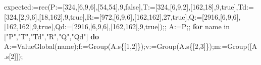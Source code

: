 \documentclass[
  10pt,
  letterpaper,
]{article}
\newenvironment{Shaded}{}{}
\newcommand{\BuiltInTok}[1]{\textcolor[rgb]{0.00,0.50,0.00}{#1}}
\newcommand{\ConstantTok}[1]{\textcolor[rgb]{0.53,0.00,0.00}{#1}}
\newcommand{\ControlFlowTok}[1]{\textcolor[rgb]{0.00,0.44,0.13}{\textbf{#1}}}
\newcommand{\ExtensionTok}[1]{#1}
\newcommand{\FloatTok}[1]{\textcolor[rgb]{0.25,0.63,0.44}{#1}}
\newcommand{\NormalTok}[1]{#1}
\newcommand{\OperatorTok}[1]{\textcolor[rgb]{0.40,0.40,0.40}{#1}}
\newcommand{\StringTok}[1]{\textcolor[rgb]{0.25,0.44,0.63}{#1}}
\newcommand{\VariableTok}[1]{\textcolor[rgb]{0.10,0.09,0.49}{#1}}
\begin{document}
\begin{Shaded}
\begin{Highlighting}[]
\VariableTok{expected}\OperatorTok{:=}\ExtensionTok{rec}\NormalTok{(}\VariableTok{P}\OperatorTok{:=}\NormalTok{[}\FloatTok{324}\OperatorTok{,}\NormalTok{[}\FloatTok{6}\OperatorTok{,}\FloatTok{9}\OperatorTok{,}\FloatTok{6}\NormalTok{]}\OperatorTok{,}\NormalTok{[}\FloatTok{54}\OperatorTok{,}\FloatTok{54}\NormalTok{]}\OperatorTok{,}\FloatTok{9}\OperatorTok{,}\ConstantTok{false}\NormalTok{]}\OperatorTok{,}\VariableTok{T}\OperatorTok{:=}\NormalTok{[}\FloatTok{324}\OperatorTok{,}\NormalTok{[}\FloatTok{6}\OperatorTok{,}\FloatTok{9}\OperatorTok{,}\FloatTok{2}\NormalTok{]}\OperatorTok{,}\NormalTok{[}\FloatTok{162}\OperatorTok{,}\FloatTok{18}\NormalTok{]}\OperatorTok{,}\FloatTok{9}\OperatorTok{,}\ConstantTok{true}\NormalTok{]}\OperatorTok{,}\VariableTok{Td}\OperatorTok{:=}\NormalTok{[}\FloatTok{324}\OperatorTok{,}\NormalTok{[}\FloatTok{2}\OperatorTok{,}\FloatTok{9}\OperatorTok{,}\FloatTok{6}\NormalTok{]}\OperatorTok{,}\NormalTok{[}\FloatTok{18}\OperatorTok{,}\FloatTok{162}\NormalTok{]}\OperatorTok{,}\FloatTok{9}\OperatorTok{,}\ConstantTok{true}\NormalTok{]}\OperatorTok{,}\VariableTok{R}\OperatorTok{:=}\NormalTok{[}\FloatTok{972}\OperatorTok{,}\NormalTok{[}\FloatTok{6}\OperatorTok{,}\FloatTok{9}\OperatorTok{,}\FloatTok{6}\NormalTok{]}\OperatorTok{,}\NormalTok{[}\FloatTok{162}\OperatorTok{,}\FloatTok{162}\NormalTok{]}\OperatorTok{,}\FloatTok{27}\OperatorTok{,}\ConstantTok{true}\NormalTok{]}\OperatorTok{,}\VariableTok{Q}\OperatorTok{:=}\NormalTok{[}\FloatTok{2916}\OperatorTok{,}\NormalTok{[}\FloatTok{6}\OperatorTok{,}\FloatTok{9}\OperatorTok{,}\FloatTok{6}\NormalTok{]}\OperatorTok{,}\NormalTok{[}\FloatTok{162}\OperatorTok{,}\FloatTok{162}\NormalTok{]}\OperatorTok{,}\FloatTok{9}\OperatorTok{,}\ConstantTok{true}\NormalTok{]}\OperatorTok{,}\VariableTok{Qd}\OperatorTok{:=}\NormalTok{[}\FloatTok{2916}\OperatorTok{,}\NormalTok{[}\FloatTok{6}\OperatorTok{,}\FloatTok{9}\OperatorTok{,}\FloatTok{6}\NormalTok{]}\OperatorTok{,}\NormalTok{[}\FloatTok{162}\OperatorTok{,}\FloatTok{162}\NormalTok{]}\OperatorTok{,}\FloatTok{9}\OperatorTok{,}\ConstantTok{true}\NormalTok{])}\OperatorTok{;;}
\VariableTok{A}\OperatorTok{:=}\VariableTok{P}\OperatorTok{;;}
\ControlFlowTok{for} \VariableTok{name} \ExtensionTok{in}\NormalTok{ [}\StringTok{"P"}\OperatorTok{,}\StringTok{"T"}\OperatorTok{,}\StringTok{"Td"}\OperatorTok{,}\StringTok{"R"}\OperatorTok{,}\StringTok{"Q"}\OperatorTok{,}\StringTok{"Qd"}\NormalTok{] }\ControlFlowTok{do}
 \VariableTok{A}\OperatorTok{:=}\BuiltInTok{ValueGlobal}\NormalTok{(}\VariableTok{name}\NormalTok{)}\OperatorTok{;}\VariableTok{f}\OperatorTok{:=}\BuiltInTok{Group}\NormalTok{(}\VariableTok{A}\NormalTok{.}\VariableTok{s}\NormalTok{\{[}\FloatTok{1}\OperatorTok{,}\FloatTok{2}\NormalTok{]\})}\OperatorTok{;}\VariableTok{v}\OperatorTok{:=}\BuiltInTok{Group}\NormalTok{(}\VariableTok{A}\NormalTok{.}\VariableTok{s}\NormalTok{\{[}\FloatTok{2}\OperatorTok{,}\FloatTok{3}\NormalTok{]\})}\OperatorTok{;}\VariableTok{m}\OperatorTok{:=}\BuiltInTok{Group}\NormalTok{([}\VariableTok{A}\NormalTok{.}\VariableTok{s}\NormalTok{[}\FloatTok{2}\NormalTok{]])}\OperatorTok{;}

\end{Highlighting}
\end{Shaded}
\end{document}
